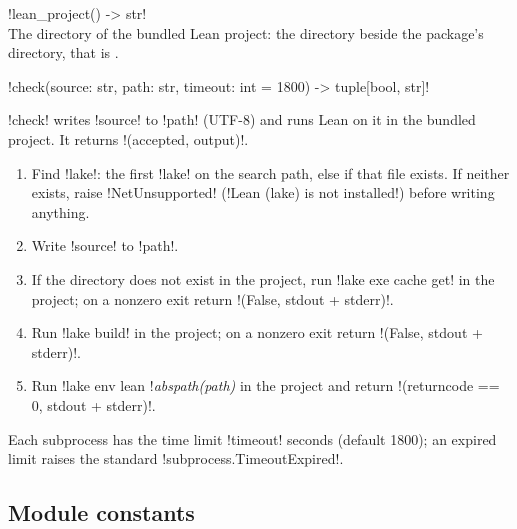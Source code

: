 {\begin{signature}
\py!lean_project() -> str!\\
The directory of the bundled Lean project: the directory  beside the package's
 directory, that is .
\end{signature}

\begin{signature}
\py!check(source: str, path: str, timeout: int = 1800) -> tuple[bool, str]!
\end{signature}

\noindent\py!check! writes \py!source! to \py!path! (UTF-8) and runs Lean on it in the bundled
project. It returns \py!(accepted, output)!.

\begin{algorithm}[\py!check!]\label{alg:lean-export-net-check}
\begin{enumerate}
\item Find \code!lake!: the first \code!lake! on the search path, else
   if that file exists. If neither exists, raise \py!NetUnsupported!
  (\code!Lean (lake) is not installed!) before writing anything.
\item Write \py!source! to \py!path!.
\item If the directory  does not exist in the project, run
  \code!lake exe cache get! in the project; on a nonzero exit return \py!(False, stdout + stderr)!.
\item Run \code!lake build! in the project; on a nonzero exit return
  \py!(False, stdout + stderr)!.
\item Run \code!lake env lean !\textit{abspath(path)} in the project and return
  \py!(returncode == 0, stdout + stderr)!.
\end{enumerate}
Each subprocess has the time limit \py!timeout! seconds (default 1800); an expired limit raises
the standard \py!subprocess.TimeoutExpired!.
\end{algorithm}

\subsection{Module constants}\label{sec:lean-export-net-constants}

}
